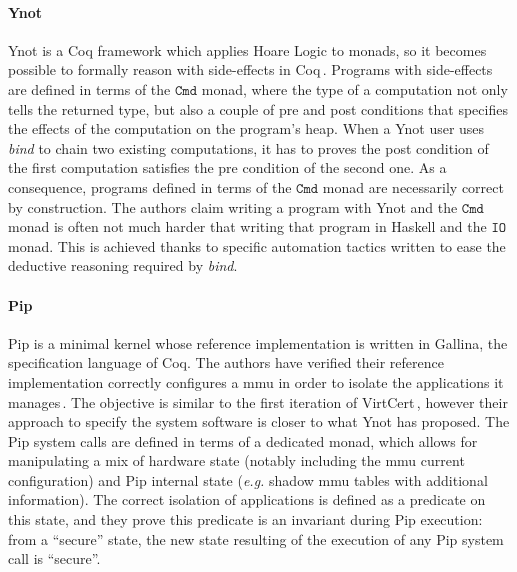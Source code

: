 \paragraph{Ynot}
%
Ynot is a Coq framework which applies Hoare Logic to monads, so it becomes
possible to formally reason with side-effects in Coq\,\cite{chlipala2009ynot}.
%
Programs with side-effects are defined in terms of the $\mathtt{Cmd}$ monad,
where the type of a computation not only tells the returned type, but also a
couple of pre and post conditions that specifies the effects of the computation
on the program's heap.
%
When a Ynot user uses \emph{bind} to chain two existing computations, it has to
proves the post condition of the first computation satisfies the pre condition
of the second one.
%
As a consequence, programs defined in terms of the $\mathtt{Cmd}$ monad are
necessarily correct by construction.
%
The authors claim writing a program with Ynot and the $\mathtt{Cmd}$ monad is
often not much harder that writing that program in Haskell and the $\mathtt{IO}$
monad.
%
This is achieved thanks to specific automation tactics written to ease the
deductive reasoning required by \emph{bind}.

\paragraph{Pip}
%
Pip is a minimal kernel whose reference implementation is written in {\sc
  Gallina}, the specification language of Coq.
%
The authors have verified their reference implementation correctly configures a
\ac{mmu} in order to isolate the applications it manages\,\cite{jomaa2016mmu}.
%
The objective is similar to the first iteration of
VirtCert\,\cite{barthe2011virtcert1}, however their approach to specify the
system software is closer to what Ynot has proposed.
%
The Pip system calls are defined in terms of a dedicated monad, which allows for
manipulating a mix of hardware state (notably including the \ac{mmu} current
configuration) and Pip internal state (\emph{e.g.} shadow \ac{mmu} tables with
additional information).
%
The correct isolation of applications is defined as a predicate on this state,
and they prove this predicate is an invariant during Pip execution:
%
from a ``secure'' state, the new state resulting of the execution of any Pip
system call is ``secure''.

